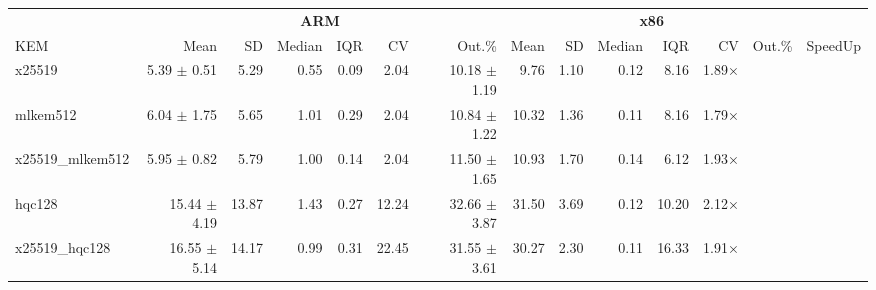 \begin{table}[!ht]
\centering
\begin{tabular}{l|rrrrrr|rrrrrr|r}
\toprule
& \multicolumn{6}{c}{\bfseries ARM} & \multicolumn{6}{c}{\bfseries x86} & \\
\cmidrule(lr){2-7} \cmidrule(lr){8-13}
			KEM & Mean & SD & Median & IQR & CV & Out.\% & Mean & SD & Median & IQR & CV & Out.\% & SpeedUp \\
\midrule
x25519 			& 5.39  $\pm$  0.51 & 5.29 & 0.55 & 0.09 & 2.04 	& 10.18 $\pm$  1.19 & 9.76 & 1.10 & 0.12 & 8.16 & 1.89× \\
mlkem512 		& 6.04  $\pm$  1.75 & 5.65 & 1.01 & 0.29 & 2.04 	& 10.84 $\pm$  1.22 & 10.32 & 1.36 & 0.11 & 8.16 & 1.79× \\
x25519_mlkem512 & 5.95  $\pm$  0.82 & 5.79 & 1.00 & 0.14 & 2.04 	& 11.50 $\pm$  1.65 & 10.93 & 1.70 & 0.14 & 6.12 & 1.93× \\
hqc128 			& 15.44 $\pm$  4.19 & 13.87 & 1.43 & 0.27 & 12.24 	& 32.66 $\pm$  3.87 & 31.50 & 3.69 & 0.12 & 10.20 & 2.12× \\
x25519_hqc128 	& 16.55 $\pm$  5.14 & 14.17 & 0.99 & 0.31 & 22.45 	& 31.55 $\pm$  3.61 & 30.27 & 2.30 & 0.11 & 16.33 & 1.91× \\
\bottomrule
\end{tabular}
\end{table}
